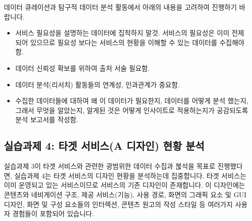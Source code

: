 \documentclass[
  letterpaper,
]{book}
\providecommand{\tightlist}{%
  \setlength{\itemsep}{0pt}\setlength{\parskip}{0pt}}\usepackage{longtable,booktabs,array}
\begin{document}
데이터 큐레이션과 탐구적 데이터 분석 활동에서 아래의 내용을 고려하여
진행하기 바랍니다.

\begin{itemize}
\tightlist
\item
  서비스 필요성을 설명하는 데이터에 집착하지 말것. 서비스의 필요성은
  이미 전제되어 있으므로 필요성 보다는 서비스의 현황을 이해할 수 있는
  데이터를 수집해야함.
\item
  데이터 신뢰성 확보를 위하여 출처 서술 필요함.
\item
  데이터 분석(리서치) 활동들의 연계성, 인과관계가 중요함.
\item
  수집한 데이터들에 대하여 왜 이 데이터가 필요한지, 데이터를 어떻게 분석
  했는지, 그래서 무엇을 알았는지, 알게된 것은 어떻게 인사이트로
  적용하는지가 공감되도록 분석 보고서를 작성함.
\end{itemize}

\subsection{실습과제 4: 타겟 서비스(A 디자인) 현황
분석}\label{uxc2e4uxc2b5uxacfcuxc81c-4-uxd0c0uxac9f-uxc11cuxbe44uxc2a4a-uxb514uxc790uxc778-uxd604uxd669-uxbd84uxc11d}

실습과제 3이 타겟 서비스와 관련한 광범위한 데이터 수집과 붆석을 목표로
진행했다면, 실습과제 4는 타겟 서비스의 디자인 현황을 분석하는데
집중합니다. 타겟 서비스는 이미 운영되고 있는 서비스이므로 서비스의 기존
디자인이 존재합니다. 이 디자인에는 콘텐츠와 네비게이션 구조, 제공
서비스(기능), 사용 경로, 화면의 그래픽 요소 및 GUI 디자인, 화면 및 구성
요소들의 인터렉션, 콘텐츠 원고의 작성 스타일 등 여러가지 사용자 경험들이
포함되어 있습니다.
\end{document}

